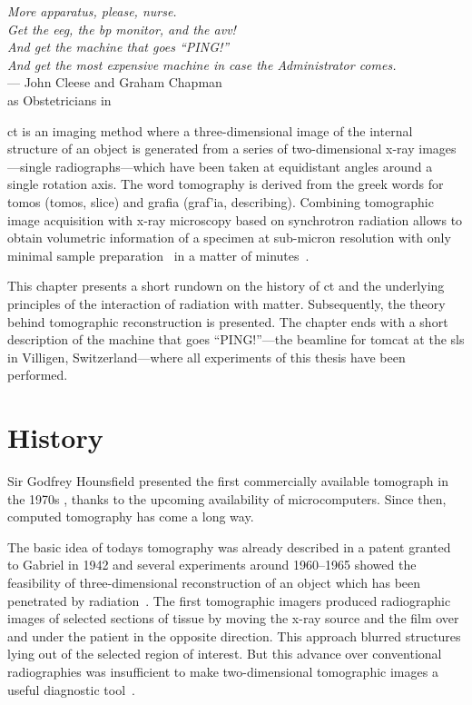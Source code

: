 \acresetall
{}\label{ch:ct}
\begin{flushright}{\slshape More apparatus, please, nurse.\\
				Get the \acs{eeg}, the \acs{bp} monitor, and the \acs{avv}!\\
				And get the machine that goes ``PING!''\\
				And get the most \emph{expensive} machine in case the Administrator comes.} \\ \medskip
	--- John Cleese and Graham Chapman\\as Obstetricians in \citep{TheMeaningOfLife}
\end{flushright}
\vspace{6cm}

\ac{ct} is an imaging method where a three-dimensional image of the internal structure of an object is generated from a series of two-dimensional x-ray images---single radiographs---which have been taken at equidistant angles around a single rotation axis. The word tomography is derived from the greek words for tomos (\greektext tomos\latintext, slice) and grafia (\greektext graf'ia\latintext, describing). Combining tomographic image acquisition with x-ray microscopy based on synchrotron radiation allows to obtain volumetric information of a specimen at sub-micron resolution with only minimal sample preparation~\cite{Stampanoni2006a} in a matter of minutes~\cite{Hintermueller2010}.

This chapter presents a short rundown on the history of \ac{ct} and the underlying principles of the interaction of radiation with matter. Subsequently, the theory behind tomographic reconstruction is presented. The chapter ends with a short description of the machine that goes ``PING!''---the beamline for \ac{tomcat} at the \ac{sls} in Villigen, Switzerland---where all experiments of this thesis have been performed.

\section{History}
Sir Godfrey Hounsfield presented the first commercially available tomograph in the 1970s \cite{Hounsfield1976a}, thanks to the upcoming availability of microcomputers. Since then, computed tomography has come a long way.

The basic idea of todays tomography was already described in a patent granted to Gabriel \citet{Frank1942} in 1942 and several experiments around 1960--1965 showed the feasibility of three-dimensional reconstruction of an object which has been penetrated by radiation~\cite{Hsieh2003}. The first tomographic imagers produced radiographic images of selected sections of tissue by moving the x-ray source and the film over and under the patient in the opposite direction. This approach blurred structures lying out of the selected region of interest. But this advance over conventional radiographies was insufficient to make two-dimensional tomographic images a useful diagnostic tool~\cite{Robb2003}.

